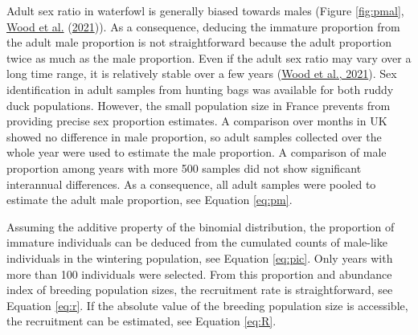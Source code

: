 \documentclass[
  english,
]{article}
\begin{document}
Adult sex ratio in waterfowl is generally biased towards males (Figure \ref{fig:pmal}, \protect\hyperlink{ref-Wood2021}{Wood et al.} (\protect\hyperlink{ref-Wood2021}{2021})). As a consequence, deducing the immature proportion from the adult male proportion is not straightforward because the adult proportion twice as much as the male proportion. Even if the adult sex ratio may vary over a long time range, it is relatively stable over a few years (\protect\hyperlink{ref-Wood2021}{Wood et al., 2021}). Sex identification in adult samples from hunting bags was available for both ruddy duck populations. However, the small population size in France prevents from providing precise sex proportion estimates. A comparison over months in UK showed no difference in male proportion, so adult samples collected over the whole year were used to estimate the male proportion. A comparison of male proportion among years with more 500 samples did not show significant interannual differences. As a consequence, all adult samples were pooled to estimate the adult male proportion, see Equation \eqref{eq:pm}.

Assuming the additive property of the binomial distribution, the proportion of immature individuals can be deduced from the cumulated counts of male-like individuals in the wintering population, see Equation \eqref{eq:pic}. Only years with more than 100 individuals were selected. From this proportion and abundance index of breeding population sizes, the recruitment rate is straightforward, see Equation \eqref{eq:r}. If the absolute value of the breeding population size is accessible, the recruitment can be estimated, see Equation \eqref{eq:R}.
\end{document}
